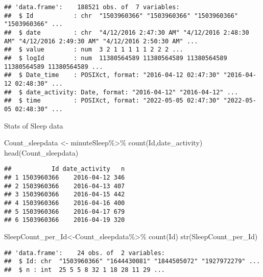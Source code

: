 \documentclass[
]{article}
\newenvironment{Shaded}{\begin{snugshade}}{\end{snugshade}}
\newcommand{\AttributeTok}[1]{\textcolor[rgb]{0.77,0.63,0.00}{#1}}
\newcommand{\ConstantTok}[1]{\textcolor[rgb]{0.00,0.00,0.00}{#1}}
\newcommand{\FunctionTok}[1]{\textcolor[rgb]{0.00,0.00,0.00}{#1}}
\newcommand{\NormalTok}[1]{#1}
\newcommand{\OtherTok}[1]{\textcolor[rgb]{0.56,0.35,0.01}{#1}}
\newcommand{\SpecialCharTok}[1]{\textcolor[rgb]{0.00,0.00,0.00}{#1}}
\newcommand{\StringTok}[1]{\textcolor[rgb]{0.31,0.60,0.02}{#1}}
\begin{document}
\begin{verbatim}
## 'data.frame':    188521 obs. of  7 variables:
##  $ Id           : chr  "1503960366" "1503960366" "1503960366" "1503960366" ...
##  $ date         : chr  "4/12/2016 2:47:30 AM" "4/12/2016 2:48:30 AM" "4/12/2016 2:49:30 AM" "4/12/2016 2:50:30 AM" ...
##  $ value        : num  3 2 1 1 1 1 1 2 2 2 ...
##  $ logId        : num  11380564589 11380564589 11380564589 11380564589 11380564589 ...
##  $ Date_time    : POSIXct, format: "2016-04-12 02:47:30" "2016-04-12 02:48:30" ...
##  $ date_activity: Date, format: "2016-04-12" "2016-04-12" ...
##  $ time         : POSIXct, format: "2022-05-05 02:47:30" "2022-05-05 02:48:30" ...
\end{verbatim}

Stats of Sleep data

\begin{Shaded}
\begin{Highlighting}[]
\NormalTok{Count\_sleepdata }\OtherTok{\textless{}{-}}\NormalTok{ minuteSleep}\SpecialCharTok{\%\textgreater{}\%}
  \FunctionTok{count}\NormalTok{(Id,date\_activity)}
\FunctionTok{head}\NormalTok{(Count\_sleepdata)}
\end{Highlighting}
\end{Shaded}

\begin{verbatim}
##           Id date_activity   n
## 1 1503960366    2016-04-12 346
## 2 1503960366    2016-04-13 407
## 3 1503960366    2016-04-15 442
## 4 1503960366    2016-04-16 400
## 5 1503960366    2016-04-17 679
## 6 1503960366    2016-04-19 320
\end{verbatim}

\begin{Shaded}
\begin{Highlighting}[]
\NormalTok{SleepCount\_per\_Id}\OtherTok{\textless{}{-}}\NormalTok{Count\_sleepdata}\SpecialCharTok{\%\textgreater{}\%}
  \FunctionTok{count}\NormalTok{(Id)}
\FunctionTok{str}\NormalTok{(SleepCount\_per\_Id)}
\end{Highlighting}
\end{Shaded}

\begin{verbatim}
## 'data.frame':    24 obs. of  2 variables:
##  $ Id: chr  "1503960366" "1644430081" "1844505072" "1927972279" ...
##  $ n : int  25 5 5 8 32 1 18 28 11 29 ...
\end{verbatim}

\begin{Shaded}
\end{Shaded}
\end{document}
